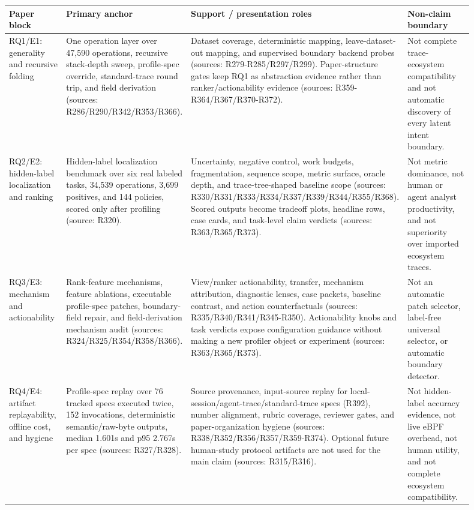 \begin{tabular}{p{0.14\linewidth}p{0.26\linewidth}p{0.28\linewidth}p{0.22\linewidth}}
\toprule
Paper block & Primary anchor & Support / presentation roles & Non-claim boundary \\
\midrule
RQ1/E1: generality and recursive folding & One operation layer over 47,590 operations, recursive stack-depth sweep, profile-spec override, standard-trace round trip, and field derivation (sources: R286/R290/R342/R353/R366). & Dataset coverage, deterministic mapping, leave-dataset-out mapping, and supervised boundary backend probes (sources: R279-R285/R297/R299). Paper-structure gates keep RQ1 as abstraction evidence rather than ranker/actionability evidence (sources: R359-R364/R367/R370-R372). & Not complete trace-ecosystem compatibility and not automatic discovery of every latent intent boundary. \\
RQ2/E2: hidden-label localization and ranking & Hidden-label localization benchmark over six real labeled tasks, 34,539 operations, 3,699 positives, and 144 policies, scored only after profiling (source: R320). & Uncertainty, negative control, work budgets, fragmentation, sequence scope, metric surface, oracle depth, and trace-tree-shaped baseline scope (sources: R330/R331/R333/R334/R337/R339/R344/R355/R368). Scored outputs become tradeoff plots, headline rows, case cards, and task-level claim verdicts (sources: R363/R365/R373). & Not metric dominance, not human or agent analyst productivity, and not superiority over imported ecosystem traces. \\
RQ3/E3: mechanism and actionability & Rank-feature mechanisms, feature ablations, executable profile-spec patches, boundary-field repair, and field-derivation mechanism audit (sources: R324/R325/R354/R358/R366). & View/ranker actionability, transfer, mechanism attribution, diagnostic lenses, case packets, baseline contrast, and action counterfactuals (sources: R335/R340/R341/R345-R350). Actionability knobs and task verdicts expose configuration guidance without making a new profiler object or experiment (sources: R363/R365/R373). & Not an automatic patch selector, label-free universal selector, or automatic boundary detector. \\
RQ4/E4: artifact replayability, offline cost, and hygiene & Profile-spec replay over 76 tracked specs executed twice, 152 invocations, deterministic semantic/raw-byte outputs, median 1.601s and p95 2.767s per spec (sources: R327/R328). & Source provenance, input-source replay for local-session/agent-trace/standard-trace specs (R392), number alignment, rubric coverage, reviewer gates, and paper-organization hygiene (sources: R338/R352/R356/R357/R359-R374). Optional future human-study protocol artifacts are not used for the main claim (sources: R315/R316). & Not hidden-label accuracy evidence, not live eBPF overhead, not human utility, and not complete ecosystem compatibility. \\
\bottomrule
\end{tabular}

